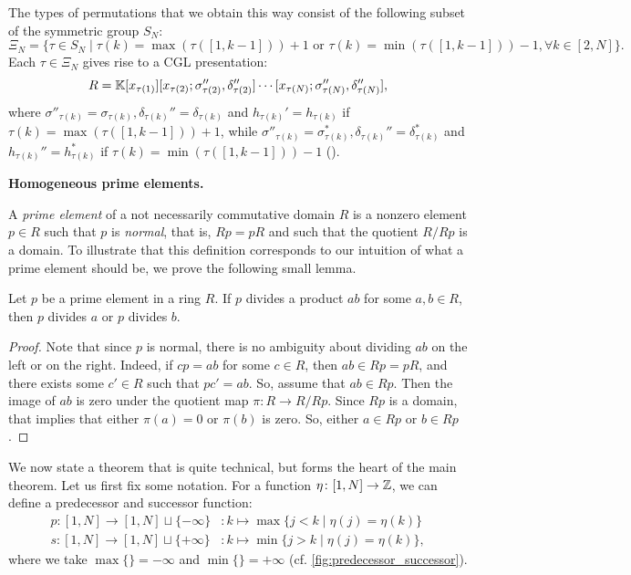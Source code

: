 %
The types of permutations that we obtain this way consist of the following subset of
the symmetric group $S_N$:
\begin{equation*}
	\Xi_N = \{\tau \in S_N \mid \tau(k) = \max (\tau ([1, k-1])) + 1 \text{ or } \tau(k) = \min (\tau ([1, k-1])) - 1, \forall k \in [2, N]\}.
\end{equation*}
%
Each $\tau \in \Xi_N$ gives rise to a CGL presentation:
\begin{equation*}
	R = \mathbb{K}[x_{\tau(1)}][x_{\tau(2)}; \sigma_{\tau(2)}'', \delta_{\tau(2)}''] \cdots [x_{\tau(N)}; \sigma_{\tau(N)}'', \delta_{\tau(N)}''],
\end{equation*}
%
where $\sigma''_{\tau(k)} = \sigma_{\tau(k)}, \delta_{\tau(k)}'' = \delta_{\tau(k)}$
and $h_{\tau(k)}' = h_{\tau(k)}$ if $\tau(k) = \max(\tau([1,k-1])) + 1$, while
$\sigma''_{\tau(k)} = \sigma^*_{\tau(k)}, \delta_{\tau(k)}'' = \delta^*_{\tau(k)}$ and
$h_{\tau(k)}'' = h_{\tau(k)}^*$ if $\tau(k) = \min(\tau([1,k-1])) - 1$
(\cite[Proposition 3.14]{GoodearlYakimov2017QCA}).

\textbf{Homogeneous prime elements.}

A \emph{prime element} of a not necessarily commutative domain $R$
is a nonzero element $p \in R$ such that $p$ is \emph{normal},
that is, $Rp = pR$ and such that the quotient $R / Rp$ is a domain. To illustrate that
this definition corresponds to our intuition of what a prime element should be, we
prove the following small lemma.
\begin{lemma}\label{lem:prime_divides_product}
	Let $p$ be a prime element in a ring $R$. If $p$ divides a product $ab$ for some $a,b
		\in R$, then $p$ divides $a$ or $p$ divides $b$.
\end{lemma}
\begin{proof}
	Note that since $p$ is normal, there is no ambiguity about dividing $ab$ on the left or
	on the right. Indeed, if $c p = ab$ for some $c \in R$, then $ab \in Rp = pR$, and
	there exists some $c' \in R$ such that $p c' = ab$. So, assume that $ab \in Rp$. Then
	the image of $ab$ is zero under the quotient map $\pi \colon R \to R/Rp$. Since $Rp$ is
	a domain, that implies that either $\pi(a) = 0$ or $\pi(b)$ is zero. So, either $a \in
		Rp$ or $b \in Rp$.
\end{proof}
%
We now state a theorem that is quite technical, but forms the heart of the main
theorem. Let us first fix some notation. For a function $\eta \colon [1, N] \to \mathbb{Z}$,
we can define a predecessor and successor
function:
\begin{align*}
	p \colon [1, N] \to [1, N] \sqcup \{-\infty\} & \colon k \mapsto  \max\{j < k \mid \eta(j) = \eta(k)\}  \\
	s \colon [1, N] \to [1, N] \sqcup \{+\infty\} & \colon k \mapsto  \min\{j > k \mid \eta(j) = \eta(k)\},
\end{align*}
%
where we take $\max \{\} = - \infty$ and $\min \{\}= + \infty$ (cf.
\cref{fig:predecessor_successor}).

